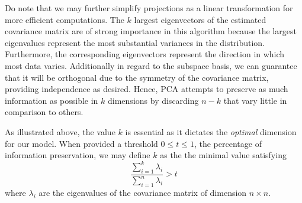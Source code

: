 \documentclass[ 12pt ]{article}
\begin{document}
Do note that we may further simplify projections as a linear transformation for more efficient computations. The $k$ largest eigenvectors of the estimated covariance matrix are of strong
importance in this algorithm because the largest eigenvalues represent the most substantial variances in the distribution. Furthermore, the corresponding eigenvectors represent the
direction in which most data varies.  Additionally in regard to the subspace basis, we can guarantee that it will be orthogonal due to the symmetry of the covariance matrix, providing
independence as desired. Hence, PCA attempts to preserve as much information as possible in $k$ dimensions by discarding $n-k$ that vary little in comparison to others.

As illustrated above, the value $k$ is essential as it dictates the \textit{optimal} dimension for our model. When provided a threshold $0 \leq t \leq 1$, the percentage of information
preservation, we may define $k$ as the the minimal value satisfying $$\frac{\sum_{i=1}^k \lambda_i}{\sum_{i=1}^n \lambda_i} > t$$ where $\lambda_i$ are the eigenvalues of the covariance
matrix of dimension $n \times n$.
\end{document}
